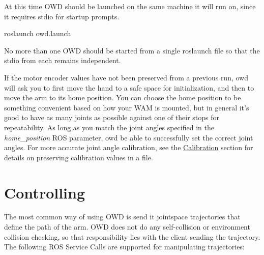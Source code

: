 At this time O\-W\-D should be launched on the same machine it will run on, since it requires stdio for startup prompts.

\begin{DoxyVerb}roslaunch owd.launch
\end{DoxyVerb}


No more than one O\-W\-D should be started from a single roslaunch file so that the stdio from each remains independent.

If the motor encoder values have not been preserved from a previous run, owd will ask you to first move the hand to a safe space for initialization, and then to move the arm to its home position. You can choose the home position to be something convenient based on how your W\-A\-M is mounted, but in general it's good to have as many joints as possible against one of their stops for repeatability. As long as you match the joint angles specified in the {\itshape home\-\_\-position} R\-O\-S parameter, owd be able to successfully set the correct joint angles. For more accurate joint angle calibration, see the \hyperlink{index_calibration}{Calibration} section for details on preserving calibration values in a file.\hypertarget{index_controlling}{}\section{Controlling}\label{index_controlling}
The most common way of using O\-W\-D is send it jointspace trajectories that define the path of the arm. O\-W\-D does not do any self-\/collision or environment collision checking, so that responsibility lies with the client sending the trajectory. The following R\-O\-S Service Calls are supported for manipulating trajectories\-:


